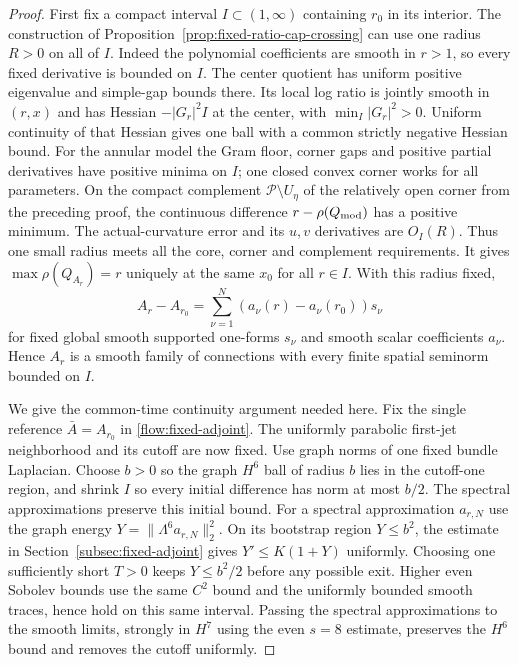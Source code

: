 \documentclass[11pt]{article}
\numberwithin{equation}{section}
\theoremstyle{definition}
\theoremstyle{remark}
\begin{document}
\begin{proof}
First fix a compact interval $I\subset(1,\infty)$ containing
$r_0$ in its interior. The construction of
Proposition~\ref{prop:fixed-ratio-cap-crossing} can use one
radius $R>0$ on all of $I$. Indeed the polynomial coefficients
are smooth in $r>1$, so every fixed derivative is bounded on
$I$. The center quotient has uniform positive eigenvalue and
simple-gap bounds there. Its local log ratio is jointly smooth
in $(r,x)$ and has Hessian $-|G_r|^2I$ at the center, with
$\min_I|G_r|^2>0$. Uniform continuity of that Hessian gives
one ball with a common strictly negative Hessian bound.
For the annular model the Gram floor, corner gaps and positive
partial derivatives have positive minima on $I$; one closed
convex corner works for all parameters. On the compact complement
$\mathcal P\setminus U_\eta$ of the relatively open corner from the
preceding proof, the continuous difference $r-\rho(Q_{\rm mod})$
has a positive minimum. The actual-curvature error and its
$u,v$ derivatives are $O_I(R)$. Thus one small radius meets
all the core, corner and complement requirements. It gives
$\max\rho(Q_{A_r})=r$ uniquely at the same $x_0$ for all
$r\in I$. With this radius fixed,
\[
 A_r-A_{r_0}=\sum_{\nu=1}^N
          (a_\nu(r)-a_\nu(r_0))s_\nu
\]
for fixed global smooth supported one-forms $s_\nu$ and
smooth scalar coefficients $a_\nu$. Hence $A_r$ is a smooth
family of connections with every finite spatial seminorm
bounded on $I$.

We give the common-time continuity argument needed here.
Fix the single reference $\bar A=A_{r_0}$ in
\eqref{flow:fixed-adjoint}. The uniformly parabolic first-jet
neighborhood and its cutoff are now fixed. Use graph norms
of one fixed bundle Laplacian. Choose $b>0$ so the graph
$H^6$ ball of radius $b$ lies in the cutoff-one region, and
shrink $I$ so every initial difference has norm at most
$b/2$. The spectral approximations preserve this initial
bound. For a spectral approximation $a_{r,N}$ use the graph energy
$Y=\|\Lambda^6a_{r,N}\|_2^2$. On its bootstrap region
$Y\le b^2$, the estimate
in Section~\ref{subsec:fixed-adjoint} gives
$Y'\le K(1+Y)$ uniformly. Choosing one sufficiently short
$T>0$ keeps $Y\le b^2/2$ before any possible exit. Higher
even Sobolev bounds use the same $C^2$ bound and the
uniformly bounded smooth traces, hence hold on this same
interval. Passing the spectral approximations to the
smooth limits, strongly in $H^7$ using the even $s=8$ estimate,
preserves the $H^6$ bound and removes the cutoff uniformly.


\end{proof}
\end{document}
